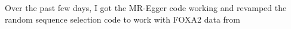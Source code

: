 \begin{Minutes}{}
\maketitle
{}
Over the past few days, I got the MR-Egger code working and revamped the random sequence selection code to work with FOXA2 data from 

\end{Minutes}
